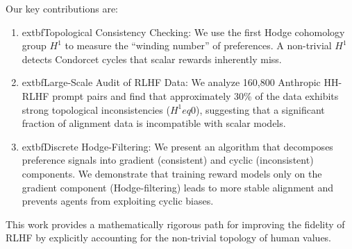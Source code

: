 Our key contributions are:
\begin{enumerate}
    \item 	extbf{Topological Consistency Checking}: We use the first Hodge cohomology group $H^1$ to measure the ``winding number'' of preferences. A non-trivial $H^1$ detects Condorcet cycles that scalar rewards inherently miss.
    
    \item 	extbf{Large-Scale Audit of RLHF Data}: We analyze 160,800 Anthropic HH-RLHF prompt pairs and find that approximately 30\% of the data exhibits strong topological inconsistencies ($H^1 
eq 0$), suggesting that a significant fraction of alignment data is incompatible with scalar models.
    
    \item 	extbf{Discrete Hodge-Filtering}: We present an algorithm that decomposes preference signals into gradient (consistent) and cyclic (inconsistent) components. We demonstrate that training reward models only on the gradient component (Hodge-filtering) leads to more stable alignment and prevents agents from exploiting cyclic biases.
\end{enumerate}

This work provides a mathematically rigorous path for improving the fidelity of RLHF by explicitly accounting for the non-trivial topology of human values.
